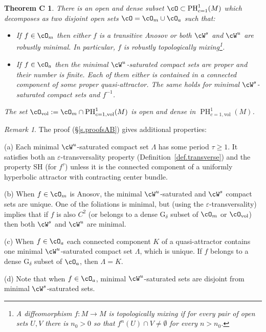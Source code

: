 \documentclass[a4paper,11pt]{amsart}
\numberwithin{equation}{section}     %
\newtheorem*{teoC}{Theorem C}
\theoremstyle{definition}
\theoremstyle{remark}
\newtheorem{obs}[teo]{Remark}
\DeclareMathOperator{\PH}{PH}
\begin{document}
\begin{teoC}
There is an open and dense subset $\cO\subset\PH^1_{c=1}(M)$ which decomposes as two disjoint open sets $\cO = \cO_m \cup \cO_a $ such that: 
\begin{itemize}
\item If $f\in\cO_m$ then either $f$ is a transitive Anosov or both $\cW^s$ and $\cW^u$ are robustly minimal.
In particular, $f$ is robustly topologically mixing\footnote{A diffeomorphism $f: M \to M$ is topologically mixing if for every pair of open sets $U,V$ there is $n_0>0$ so that $f^n(U)\cap V \neq \emptyset$ for every $n>n_0$.}. 
\item If $f \in \cO_a$ then the minimal $\cW^u$-saturated compact sets are proper and their number is finite.
Each of them either is contained in a connected component of some proper quasi-attractor. The same holds for minimal $\cW^s$-saturated compact sets and $f^{-1}$.
\end{itemize}
The set $\cO_{\mathrm{vol}}:=\cO_m\cap \PH^1_{c=1,\mathrm{vol}}(M)$ is open and dense in
$\PH^1_{c=1,\mathrm{vol}}(M)$.
\end{teoC}
\begin{obs} The proof (\S\ref{s.proofsAB}) gives additional properties:
\smallskip

\noindent
(a) Each minimal $\cW^u$-saturated compact set $\Lambda$ has some period $\tau\geq 1$. It satisfies both an $\varepsilon$-transversality property (Definition~\ref{def.transverse}) and the property SH (for $f^\tau$) unless it is the connected component of a uniformly hyperbolic attractor with contracting center bundle.
\smallskip

\noindent
(b) When $f\in \cO_m$ is Anosov, the minimal $\cW^u$-saturated and $\cW^s$ compact sets are unique. One of the foliations is minimal, but (using the $\varepsilon$-transversality) \cite{ACW} implies that if $f$ is also $C^2$ (or belongs to a dense G$_\delta$ subset of $\cO_m$ or $\cO_{\mathrm{vol}}$) then both $\cW^s$ and $\cW^u$ are minimal.
\smallskip

\noindent
(c) When $f\in \cO_a$ each connected component $K$ of a quasi-attractor contains one minimal $\cW^u$-saturated compact set $\Lambda$, which is unique. If $f$ belongs to a dense G$_\delta$ subset of $\cO_a$, then $\Lambda=K$.\smallskip

\noindent
(d) Note that when $f\in \cO_a$, minimal $\cW^u$-saturated sets are disjoint from minimal $\cW^s$-saturated sets.
\end{obs}
\end{document}

